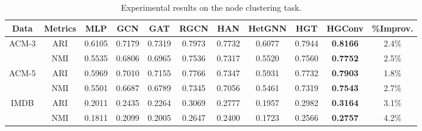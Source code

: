 \begin{table*}[t]
\centering
\caption{Experimental results on the node clustering task.}
\label{tab:clustering_results}
\begin{tabular}{|c|c|c|c|c|c|c|c|c|c|c|}
\hline
Data                   & Metrics & MLP    & GCN    & GAT    & RGCN   & HAN    & HetGNN & HGT    & HGConv    & \%Improv.           \\ \hline
\multirow{2}{*}{ACM-3} & ARI     & 0.6105 & 0.7179 & 0.7319 & 0.7973 & 0.7732 & 0.6077 & 0.7944 & \textbf{0.8166} & 2.4\% \\ 
                       & NMI     & 0.5535 & 0.6806 & 0.6965 & 0.7536 & 0.7317 & 0.5520 & 0.7560 & \textbf{0.7752} & 2.5\% \\ \hline
\multirow{2}{*}{ACM-5} & ARI     & 0.5969 & 0.7010 & 0.7155 & 0.7766 & 0.7347 & 0.5931 & 0.7732 & \textbf{0.7903} & 1.8\% \\ 
                       & NMI     & 0.5501 & 0.6687 & 0.6789 & 0.7345 & 0.7056 & 0.5461 & 0.7319 & \textbf{0.7543} & 2.7\% \\ \hline
\multirow{2}{*}{IMDB}  & ARI     & 0.2011 & 0.2435 & 0.2264 & 0.3069 & 0.2777 & 0.1957 & 0.2982 & \textbf{0.3164} & 3.1\% \\ 
                       & NMI     & 0.1811 & 0.2099 & 0.2005 & 0.2647 & 0.2400 & 0.1723 & 0.2566 & \textbf{0.2757} & 4.2\% \\ \hline
\end{tabular}
\end{table*}

